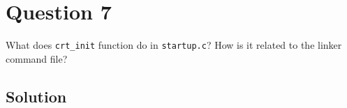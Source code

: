 \section*{Question 7}

What does \texttt{crt\_init} function do in \texttt{startup.c}?
How is it related to the linker command file?

\subsection*{Solution}
